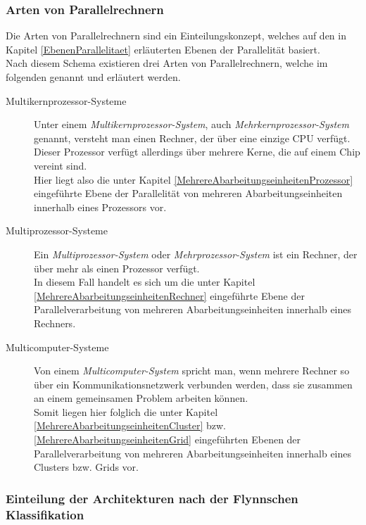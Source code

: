 			\subsubsection{Arten von Parallelrechnern}
				
				Die Arten von Parallelrechnern sind ein Einteilungskonzept, welches auf den in Kapitel \ref{EbenenParallelitaet} erläuterten Ebenen der Parallelität basiert.\\
				Nach diesem Schema existieren drei Arten von Parallelrechnern, welche im folgenden genannt und erläutert werden. \cite{BSMultiprozessorsysteme}
				
				\begin{description}
					\item [Multikernprozessor-Systeme]
						Unter einem \textit{Multikernprozessor-System}, auch \textit{Mehrkernprozessor-System} genannt, versteht man einen Rechner, der über eine einzige CPU verfügt. Dieser Prozessor verfügt allerdings über mehrere Kerne, die auf einem Chip vereint sind. \cite{MehrkernprozessorWikipedia}\\
						Hier liegt also die unter Kapitel \ref{MehrereAbarbeitungseinheitenProzessor} eingeführte Ebene der Parallelität von mehreren Abarbeitungseinheiten innerhalb eines Prozessors vor.
					
					\item [Multiprozessor-Systeme]
						Ein \textit{Multiprozessor-System} oder \textit{Mehrprozessor-System} ist ein Rechner, der über mehr als einen Prozessor verfügt. \cite{MehrprozessorsystemWikipedia}\\
						In diesem Fall handelt es sich um die unter Kapitel \ref{MehrereAbarbeitungseinheitenRechner} eingeführte Ebene der Parallelverarbeitung von mehreren Abarbeitungseinheiten innerhalb eines Rechners.
					
					\item [Multicomputer-Systeme]
						Von einem \textit{Multicomputer-System} spricht man, wenn mehrere Rechner so über ein Kommunikationsnetzwerk verbunden werden, dass sie zusammen an einem gemeinsamen Problem arbeiten können. \cite{MulticomputerIGI}\\
						Somit liegen hier folglich die unter Kapitel \ref{MehrereAbarbeitungseinheitenCluster} bzw. \ref{MehrereAbarbeitungseinheitenGrid} eingeführten Ebenen der Parallelverarbeitung von mehreren Abarbeitungseinheiten innerhalb eines Clusters bzw. Grids vor.
				\end{description}
				
			\subsubsection{Einteilung der Architekturen nach der Flynnschen Klassifikation}
				
